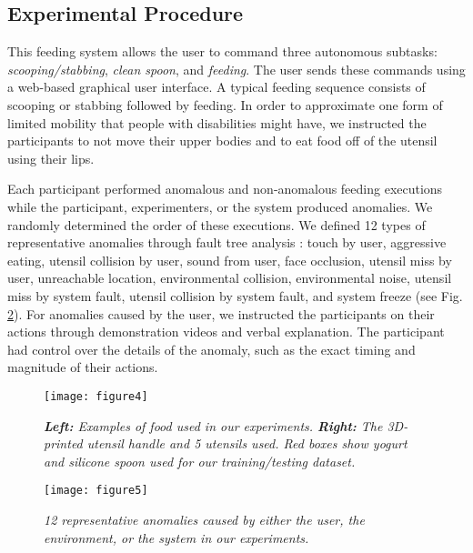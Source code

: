 \documentclass[letterpaper, 10 pt, conference]{ieeeconf}
\begin{document}
\subsection{Experimental Procedure}
This feeding system allows the user to command three autonomous subtasks: \textit{scooping/stabbing}, \textit{clean spoon}, and \textit{feeding}. The user sends these commands using a web-based graphical user interface. A typical feeding sequence consists of scooping or stabbing followed by feeding. In order to approximate one form of limited mobility that people with disabilities might have, we instructed the participants to not move their upper bodies and to eat food off of the utensil using their lips.

Each participant performed anomalous and non-anomalous feeding executions while the participant, experimenters, or the system produced anomalies. We randomly determined the order of these executions. We defined 12 types of representative anomalies through fault tree analysis \cite{ogorodnikova2008methodology}: touch by user, aggressive eating, utensil collision by user, sound from user, face occlusion, utensil miss by user, unreachable location, environmental collision, environmental noise, utensil miss by system fault, utensil collision by system fault, and system freeze (see Fig. \ref{fig: anomaly}). For anomalies caused by the user, we instructed the participants on their actions through demonstration videos and verbal explanation. The participant had control over the details of the anomaly, such as the exact timing and magnitude of their actions.


\begin{figure}
	\centering
    \vspace{8pt}
    \texttt{[image: figure4]}
    \caption{\textit{\textbf{Left:} Examples of food used in our experiments. \textbf{Right:} The 3D-printed utensil handle and 5 utensils used. Red boxes show yogurt and silicone spoon used for our training/testing dataset.}}
    \label{fig: feeding_tool}
    \vspace{-1.5em}    
\end{figure}

\begin{figure}
	\centering
    \vspace{8pt}
    \texttt{[image: figure5]}
    \caption{\textit{12 representative anomalies caused by either the user, the environment, or the system in our experiments.}}
    \label{fig: anomaly}
    \vspace{-1.5em}    
\end{figure}
\end{document}
